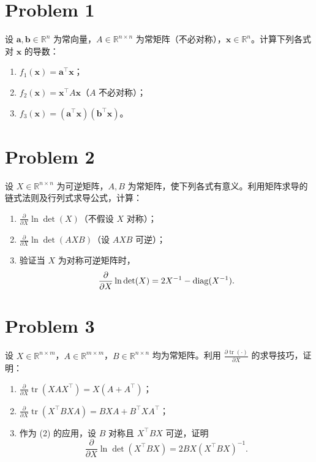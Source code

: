 \section*{Problem 1}

设 $\bm{a}, \bm{b} \in \mathbb{R}^n$ 为常向量，$A \in \mathbb{R}^{n \times n}$ 为常矩阵（不必对称），$\bm{x} \in \mathbb{R}^n$。计算下列各式对 $\bm{x}$ 的导数：

\begin{enumerate}
    \item $f_1(\bm{x}) = \bm{a}^\top \bm{x}$；
    \item $f_2(\bm{x}) = \bm{x}^\top A \bm{x}$（$A$ 不必对称）；
    \item $f_3(\bm{x}) = \left(\bm{a}^\top \bm{x}\right)\left(\bm{b}^\top \bm{x}\right)$。
\end{enumerate}

\section*{Problem 2}

设 $X \in \mathbb{R}^{n \times n}$ 为可逆矩阵，$A, B$ 为常矩阵，使下列各式有意义。利用矩阵求导的链式法则及行列式求导公式，计算：

\begin{enumerate}
    \item $\displaystyle \frac{\partial}{\partial X} \ln \det(X)$（不假设 $X$ 对称）；
    \item $\displaystyle \frac{\partial}{\partial X} \ln \det(AXB)$（设 $AXB$ 可逆）；
    \item 验证当 $X$ 为对称可逆矩阵时，
    \[
        \frac{\partial}{\partial X} \ln \det(X)
        =
        2X^{-1} - \mathrm{diag}(X^{-1}).
    \]
\end{enumerate}

\section*{Problem 3}

设 $X \in \mathbb{R}^{n \times m}$，$A \in \mathbb{R}^{m \times m}$，$B \in \mathbb{R}^{n \times n}$ 均为常矩阵。利用 $\displaystyle \frac{\partial \operatorname{tr}(\cdot)}{\partial X}$ 的求导技巧，证明：

\begin{enumerate}
    \item $\displaystyle \frac{\partial}{\partial X} \operatorname{tr}\left(XAX^\top\right) = X(A + A^\top)$；
    \item $\displaystyle \frac{\partial}{\partial X} \operatorname{tr}\left(X^\top BXA\right) = BXA + B^\top XA^\top$；
    \item 作为 (2) 的应用，设 $B$ 对称且 $X^\top BX$ 可逆，证明
    \[
        \frac{\partial}{\partial X} \ln \det\left(X^\top BX\right)
        =
        2BX\left(X^\top BX\right)^{-1}.
    \]
\end{enumerate}
